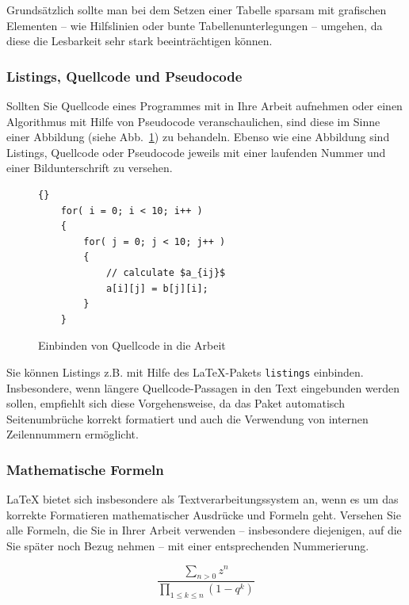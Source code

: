 \noindent
Grundsätzlich sollte man bei dem Setzen einer Tabelle sparsam mit grafischen Elementen -- wie Hilfslinien oder bunte Tabellenunterlegungen -- umgehen, da diese die Lesbarkeit sehr stark beeinträchtigen können.


\subsubsection{Listings, Quellcode und Pseudocode}

Sollten Sie Quellcode eines Programmes mit in Ihre Arbeit aufnehmen oder einen Algorithmus mit Hilfe von Pseudocode veranschaulichen, sind diese im Sinne einer Abbildung (siehe Abb.~\ref{fig_Abb3}) zu behandeln.
Ebenso wie eine Abbildung sind Listings, Quellcode oder Pseudocode jeweils mit einer laufenden Nummer und einer Bildunterschrift zu versehen.

\begin{figure}[ht]
\lstset{language=c++}
\begin{lstlisting}{}
    for( i = 0; i < 10; i++ )
    {
        for( j = 0; j < 10; j++ )
        {
            // calculate $a_{ij}$
            a[i][j] = b[j][i];
        }
    }

\end{lstlisting}
  \caption{Einbinden von Quellcode in die Arbeit}
  \label{fig_Abb3}
\end{figure}

Sie können Listings z.B. mit Hilfe des \LaTeX-Pakets {\tt listings} einbinden.
Insbesondere, wenn längere Quellcode-Passagen in den Text eingebunden werden sollen, empfiehlt sich diese Vorgehensweise, da das Paket automatisch Seitenumbrüche korrekt formatiert und auch die Verwendung von internen Zeilennummern ermöglicht.

\subsubsection{Mathematische Formeln}

{\LaTeX} bietet sich insbesondere als Textverarbeitungssystem an, wenn es um das korrekte Formatieren mathematischer Ausdrücke und Formeln geht.
Versehen Sie alle Formeln, die Sie in Ihrer Arbeit verwenden -- insbesondere diejenigen, auf die Sie später noch Bezug nehmen --  mit einer entsprechenden Nummerierung.

\begin{equation}\label{formel1}
\frac{\sum_{n > 0} z^n}
{\prod_{1\leq k\leq n} (1-q^k)}
\end{equation}


